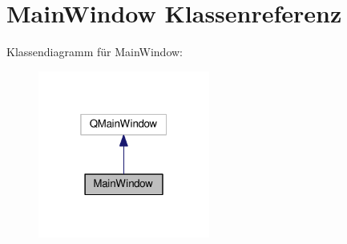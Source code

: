 \hypertarget{classMainWindow}{}\section{Main\+Window Klassenreferenz}
\label{classMainWindow}


Klassendiagramm für Main\+Window\+:\nopagebreak
\begin{figure}[H]
\begin{center}
\leavevmode
\includegraphics[width=160pt]{classMainWindow__inherit__graph}
\end{center}
\end{figure}

